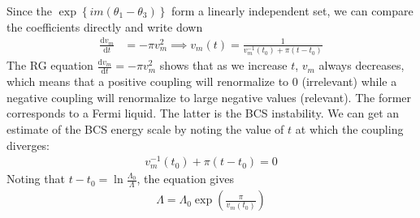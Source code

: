 \documentclass[14pt]{extarticle}
\begin{document}
Since the \(\exp\left\{im\left(\theta_1 - \theta_3\right)\right\}\) form a linearly independent set, we can compare the coefficients directly and write down
\begin{equation}\begin{aligned}
\label{rgeq}
\frac{\mathrm{d}v_m}{\mathrm{d}t} &= -\pi v^2_{m} \implies v_m(t) = \frac{1}{v_m^{-1}(t_0) + \pi \left( t - t_0 \right) }
\end{aligned}\end{equation}
The RG equation \(\frac{\mathrm{d}v_m}{\mathrm{d}t} = -\pi v^2_{m}\) shows that as we increase \(t\), \(v_m\) always decreases, which means that a positive coupling will renormalize to 0 (irrelevant) while a negative coupling will renormalize to large negative values (relevant). The former corresponds to a Fermi liquid. The latter is the BCS instability. We can get an estimate of the BCS energy scale by noting the value of \(t\) at which the coupling diverges:
\begin{equation}\begin{aligned}
	v_m^{-1}(t_0) + \pi \left( t - t_0 \right)  = 0
\end{aligned}\end{equation}
Noting that \(t - t_0 = \ln \frac{\Lambda_0}{\Lambda}\), the equation gives
\begin{equation}\begin{aligned}
	\Lambda = \Lambda_0 \exp\left(\frac{\pi}{v_m(t_0)}\right)
\end{aligned}\end{equation}
\end{document}
